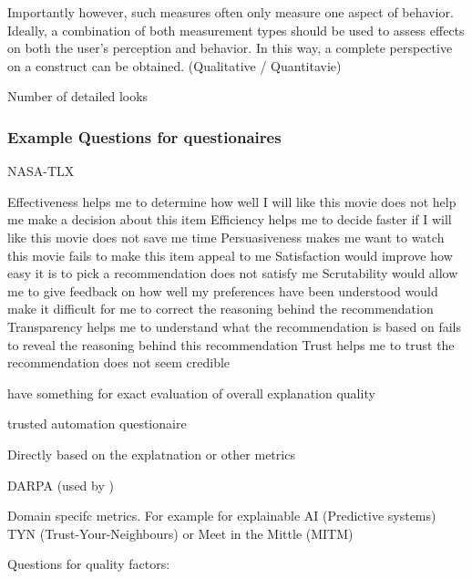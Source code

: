 \glqq Importantly however, such measures often only measure one aspect of behavior. Ideally, a combination of both measurement types should be used to assess effects on both the user’s perception and behavior. In this way, a complete perspective on a construct can be obtained.\grqq{} (Qualitative / Quantitavie) \cite{waa_evaluating_2021}

Number of detailed looks

\subsubsection{Example Questions for questionaires}

NASA-TLX \cite{tsai_evaluating_2019}

Effectiveness helps me to determine how well I will like this movie does not help me make a decision about this item Efficiency helps me to decide faster if I will like this movie does not save me time Persuasiveness makes me want to watch this movie fails to make this item appeal to me Satisfaction would improve how easy it is to pick a recommendation does not satisfy me Scrutability would allow me to give feedback on how well my preferences have been understood would make it difficult for me to correct the reasoning behind the recommendation Transparency helps me to understand what the recommendation is based on fails to reveal the reasoning behind this recommendation Trust helps me to trust the recommendation does not seem credible \cite{balog_measuring_2020}

\cite{knijnenburg2012explaining, hernandez-bocanegra_effects_2020} have something for exact evaluation of overall explanation quality

\cite{weitz_you_2019} trusted automation questionaire

Directly based on the explatnation \cite{sato_action-triggering_2019} or other metrics 

DARPA (used by \cite{martin_evaluating_2021}) \cite{gunning2019darpa}

Domain specifc metrics. For example for explainable AI (Predictive systems) TYN (Trust-Your-Neighbours) or Meet in the Mittle (MITM) \cite{martin_evaluating_2021}

Questions for quality factors:

